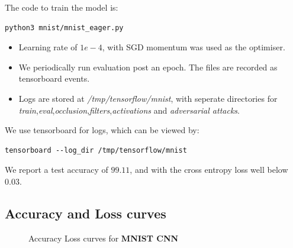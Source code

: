 The code to train the model is:

\begin{lstlisting}
python3 mnist/mnist_eager.py
\end{lstlisting}

\begin{itemize}
\item Learning rate of $1e-4$, with SGD momentum was used as the optimiser.
\item We periodically run evaluation post an epoch. The files are recorded as tensorboard events.
\item Logs are stored at \textit{/tmp/tensorflow/mnist}, with seperate directories for \textit{train},\textit{eval},\textit{occlusion},\textit{filters},\textit{activations} and \textit{adversarial attacks}.
\end{itemize}


We use tensorboard for logs, which can be viewed by:
\begin{lstlisting}
tensorboard --log_dir /tmp/tensorflow/mnist
\end{lstlisting}

We report a test accuracy of $99.11$, and with the cross entropy loss well below $0.03$.

\subsection{Accuracy and Loss curves}

\begin{figure}[ht]
\centering
\caption{Accuracy Loss curves for \textbf{MNIST CNN}}
\end{figure}

